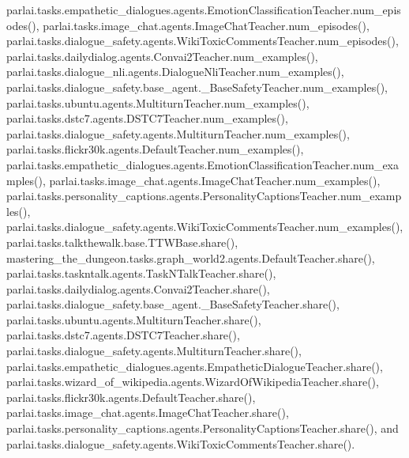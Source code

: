 parlai.\+tasks.\+empathetic\+\_\+dialogues.\+agents.\+Emotion\+Classification\+Teacher.\+num\+\_\+episodes(), parlai.\+tasks.\+image\+\_\+chat.\+agents.\+Image\+Chat\+Teacher.\+num\+\_\+episodes(), parlai.\+tasks.\+dialogue\+\_\+safety.\+agents.\+Wiki\+Toxic\+Comments\+Teacher.\+num\+\_\+episodes(), parlai.\+tasks.\+dailydialog.\+agents.\+Convai2\+Teacher.\+num\+\_\+examples(), parlai.\+tasks.\+dialogue\+\_\+nli.\+agents.\+Dialogue\+Nli\+Teacher.\+num\+\_\+examples(), parlai.\+tasks.\+dialogue\+\_\+safety.\+base\+\_\+agent.\+\_\+\+Base\+Safety\+Teacher.\+num\+\_\+examples(), parlai.\+tasks.\+ubuntu.\+agents.\+Multiturn\+Teacher.\+num\+\_\+examples(), parlai.\+tasks.\+dstc7.\+agents.\+D\+S\+T\+C7\+Teacher.\+num\+\_\+examples(), parlai.\+tasks.\+dialogue\+\_\+safety.\+agents.\+Multiturn\+Teacher.\+num\+\_\+examples(), parlai.\+tasks.\+flickr30k.\+agents.\+Default\+Teacher.\+num\+\_\+examples(), parlai.\+tasks.\+empathetic\+\_\+dialogues.\+agents.\+Emotion\+Classification\+Teacher.\+num\+\_\+examples(), parlai.\+tasks.\+image\+\_\+chat.\+agents.\+Image\+Chat\+Teacher.\+num\+\_\+examples(), parlai.\+tasks.\+personality\+\_\+captions.\+agents.\+Personality\+Captions\+Teacher.\+num\+\_\+examples(), parlai.\+tasks.\+dialogue\+\_\+safety.\+agents.\+Wiki\+Toxic\+Comments\+Teacher.\+num\+\_\+examples(), parlai.\+tasks.\+talkthewalk.\+base.\+T\+T\+W\+Base.\+share(), mastering\+\_\+the\+\_\+dungeon.\+tasks.\+graph\+\_\+world2.\+agents.\+Default\+Teacher.\+share(), parlai.\+tasks.\+taskntalk.\+agents.\+Task\+N\+Talk\+Teacher.\+share(), parlai.\+tasks.\+dailydialog.\+agents.\+Convai2\+Teacher.\+share(), parlai.\+tasks.\+dialogue\+\_\+safety.\+base\+\_\+agent.\+\_\+\+Base\+Safety\+Teacher.\+share(), parlai.\+tasks.\+ubuntu.\+agents.\+Multiturn\+Teacher.\+share(), parlai.\+tasks.\+dstc7.\+agents.\+D\+S\+T\+C7\+Teacher.\+share(), parlai.\+tasks.\+dialogue\+\_\+safety.\+agents.\+Multiturn\+Teacher.\+share(), parlai.\+tasks.\+empathetic\+\_\+dialogues.\+agents.\+Empathetic\+Dialogue\+Teacher.\+share(), parlai.\+tasks.\+wizard\+\_\+of\+\_\+wikipedia.\+agents.\+Wizard\+Of\+Wikipedia\+Teacher.\+share(), parlai.\+tasks.\+flickr30k.\+agents.\+Default\+Teacher.\+share(), parlai.\+tasks.\+image\+\_\+chat.\+agents.\+Image\+Chat\+Teacher.\+share(), parlai.\+tasks.\+personality\+\_\+captions.\+agents.\+Personality\+Captions\+Teacher.\+share(), and parlai.\+tasks.\+dialogue\+\_\+safety.\+agents.\+Wiki\+Toxic\+Comments\+Teacher.\+share().

\mbox{\label{classparlai_1_1tasks_1_1dailydialog_1_1agents_1_1Convai2Teacher_a67499af89d747fa0efeae42d133e52c1}} 
